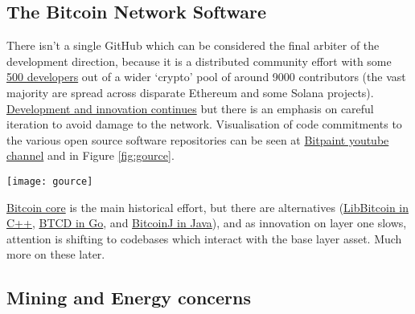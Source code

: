 \subsection{The Bitcoin Network Software}
There isn't a single GitHub which can be considered the final arbiter of the development direction, because it is a distributed community effort with some \href{https://decrypt.co/66740/who-are-the-fastest-growing-developer-communities-in-crypto}{500 developers} out of a wider `crypto' pool of around 9000 contributors (the vast majority are spread across disparate Ethereum and some Solana projects). \href{https://bitcoinops.org/en/newsletters/2021/12/22/}{Development and innovation continues} but there is an emphasis on careful iteration to avoid damage to the network. Visualisation of code commitments to the various open source software repositories can be seen at \href{https://www.youtube.com/channel/UC4DT4qudqogkmbqVAQy8eFg/videos}{Bitpaint youtube channel} and in Figure \ref{fig:gource}.\par
\begin{figure*}[ht]\centering %
	\texttt{[image: gource]}
	\caption{\href{https://github.com/bitpaint/bitcoin-gources}{Bitpaint}: Contributions to the Bitcoin ecosystem. Reused with permission.}
	\label{fig:gource}
\end{figure*}
\href{https://github.com/bitcoin/}{Bitcoin core} is the main historical effort, but there are alternatives (\href{https://github.com/libbitcoin/libbitcoin-node/wiki}{LibBitcoin in C++}, \href{https://github.com/btcsuite/btcd}{BTCD in Go}, and \href{https://bitcoinj.github.io/getting-started}{BitcoinJ in Java}), and as innovation on layer one slows, attention is shifting to codebases which interact with the base layer asset. Much more on these later.
\subsection{Mining and Energy concerns}
